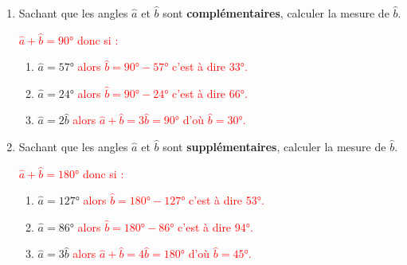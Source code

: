 \begin{corrige}
    \begin{enumerate}
        \item Sachant que les angles $\hat{a}$ et $\hat{b}$ sont \textbf{complémentaires}, calculer la mesure de $\hat{b}$.
        \par\textcolor{red}{$\hat{a}+\hat{b}=\ang{90}$ donc si :}
        \par
        \begin{enumerate}
            \item $\hat{a}=\ang{57}$
            \textcolor{red}{ alors $\hat{b}=\ang{90}-\ang{57}$ c'est à dire \ang{33}.}
            \item $\hat{a}=\ang{24}$
            \textcolor{red}{ alors $\hat{b}=\ang{90}-\ang{24}$ c'est à dire \ang{66}.}
            \item $\hat{a}=2\hat{b}$
            \textcolor{red}{ alors $\hat{a}+\hat{b}=3\hat{b}=\ang{90}$ d'où $\hat{b}=\ang{30}$.}
        \end{enumerate}
        \item Sachant que les angles $\hat{a}$ et $\hat{b}$ sont \textbf{supplémentaires}, calculer la mesure de $\hat{b}$.
        \par\textcolor{red}{$\hat{a}+\hat{b}=\ang{180}$ donc si :}
        \par
        \begin{enumerate}
            \item $\hat{a}=\ang{127}$
            \textcolor{red}{ alors $\hat{b}=\ang{180}-\ang{127}$ c'est à dire \ang{53}.}
            \item $\hat{a}=\ang{86}$
            \textcolor{red}{ alors $\hat{b}=\ang{180}-\ang{86}$ c'est à dire \ang{94}.}
            \item $\hat{a}=3\hat{b}$
            \textcolor{red}{ alors $\hat{a}+\hat{b}=4\hat{b}=\ang{180}$ d'où $\hat{b}=\ang{45}$.}
        \end{enumerate}
    \end{enumerate}
\end{corrige}
